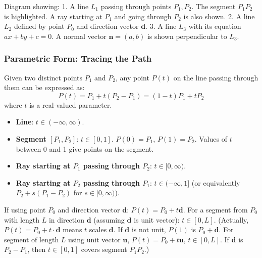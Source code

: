 \begin{visualexample}
\label{vis:A.1.2.representations}
Diagram showing:
1. A line $L_1$ passing through points $P_1, P_2$. The segment $P_1P_2$ is highlighted. A ray starting at $P_1$ and going through $P_2$ is also shown.
2. A line $L_2$ defined by point $P_0$ and direction vector $\mathbf{d}$.
3. A line $L_3$ with its equation $ax+by+c=0$. A normal vector $\mathbf{n}=(a,b)$ is shown perpendicular to $L_3$.
\end{visualexample}

\subsubsection{Parametric Form: Tracing the Path}
\label{sssec:A.1.2.2}

\begin{definition}
\label{def:A.1.2.parametric}
Given two distinct points $P_1$ and $P_2$, any point $P(t)$ on the line passing through them can be expressed as:
$$ P(t) = P_1 + t(P_2 - P_1) = (1-t)P_1 + tP_2 $$
where $t$ is a real-valued parameter.
\begin{itemize}
    \item \textbf{Line}: $t \in (-\infty, \infty)$.
    \item \textbf{Segment $[P_1, P_2]$}: $t \in [0, 1]$. $P(0)=P_1$, $P(1)=P_2$. Values of $t$ between 0 and 1 give points on the segment.
    \item \textbf{Ray starting at $P_1$ passing through $P_2$}: $t \in [0, \infty)$.
    \item \textbf{Ray starting at $P_2$ passing through $P_1$}: $t \in (-\infty, 1]$ (or equivalently $P_2 + s(P_1-P_2)$ for $s \in [0, \infty)$).
\end{itemize}
If using point $P_0$ and direction vector $\mathbf{d}$: $P(t) = P_0 + t\mathbf{d}$.
For a segment from $P_0$ with length $L$ in direction $\mathbf{d}$ (assuming $\mathbf{d}$ is unit vector): $t \in [0, L]$. (Actually, $P(t) = P_0 + t \cdot \mathbf{d}$ means $t$ scales $\mathbf{d}$. If $\mathbf{d}$ is not unit, $P(1)$ is $P_0+\mathbf{d}$. For segment of length $L$ using unit vector $\mathbf{u}$, $P(t)=P_0+t\mathbf{u}$, $t \in [0,L]$. If $\mathbf{d}$ is $P_2-P_1$, then $t \in [0,1]$ covers segment $P_1P_2$.)
\end{definition}


